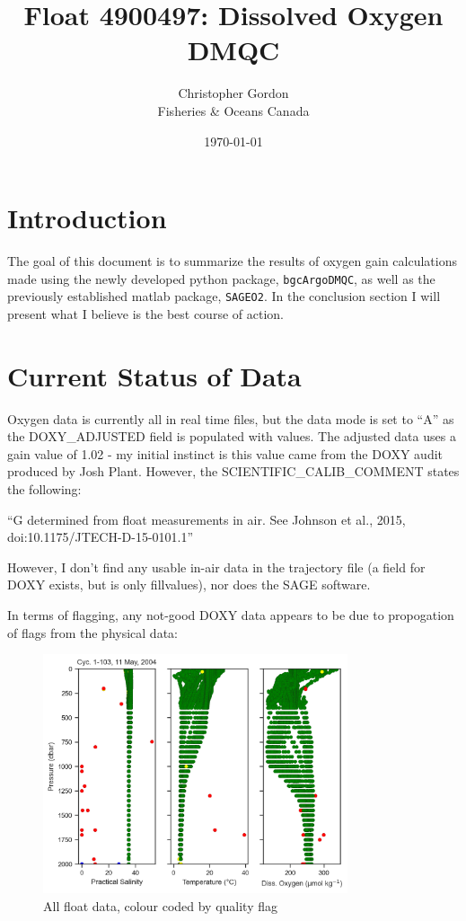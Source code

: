 \documentclass[11pt,english]{article} %
\title{Float 4900497: Dissolved Oxygen DMQC}
\author{Christopher Gordon\\Fisheries \& Oceans Canada}
\date{\today}
\begin{document}
\maketitle

\section{Introduction}

The goal of this document is to summarize the results of oxygen gain
calculations made using the newly developed python package, \verb|bgcArgoDMQC|,
as well as the previously established matlab package, \verb|SAGEO2|. In the
conclusion section I will present what I believe is the best course of action.

\section{Current Status of Data}

Oxygen data is currently all in real time files, but the data mode is set
to ``A'' as the DOXY\_ADJUSTED field is populated with values. The
adjusted data uses a gain value of 1.02 - my initial instinct is this value came
from the DOXY audit produced by Josh Plant. However, the \newline
SCIENTIFIC\_CALIB\_COMMENT states the following: 

\noindent``G determined from float measurements in air. See Johnson et al., 2015, doi:10.1175/JTECH-D-15-0101.1''

However, I don't find any usable in-air data in the trajectory file (a field
for DOXY exists, but is only fillvalues), nor does the SAGE software.

In terms of flagging, any not-good DOXY data appears to be due to propogation
of flags from the physical data: 

\begin{figure}[H]
    \centering
    \includegraphics[width=0.8\textwidth]{../figures/4900497/qcprofiles.png}
    \caption{All float data, colour coded by quality flag}
\end{figure}
\end{document}
